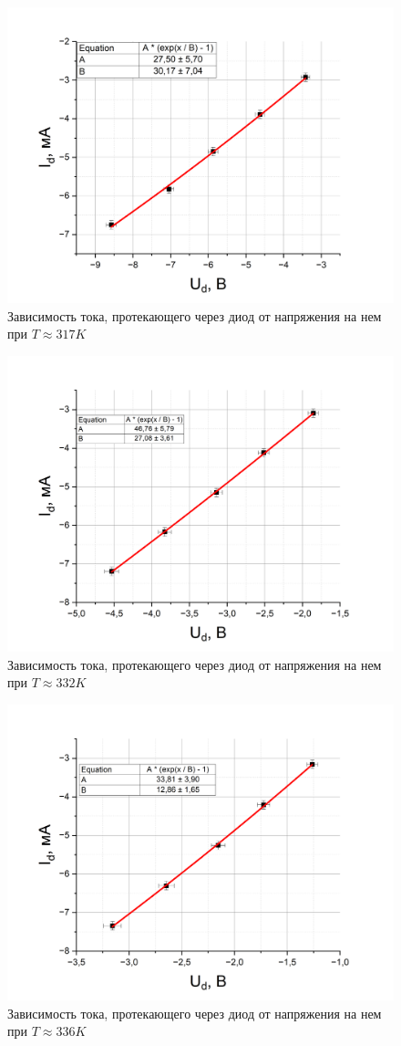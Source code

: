 \documentclass[a4paper,12pt]{article}
\begin{document}
\begin{figure}[h!]
	\centering
	\includegraphics[width=0.8\linewidth]{reverse_T_2}
	\caption{Зависимость тока, протекающего через диод от напряжения на нем при $T \approx 317K$}
\end{figure}

\newpage

\begin{figure}[h!]
	\centering
	\includegraphics[width=0.8\linewidth]{reverse_T_3}
	\caption{Зависимость тока, протекающего через диод от напряжения на нем при $T \approx 332K$}
\end{figure}

\begin{figure}[h!]
	\centering
	\includegraphics[width=0.8\linewidth]{reverse_T_4}
	\caption{Зависимость тока, протекающего через диод от напряжения на нем при $T \approx 336K$}
\end{figure}
\end{document}
